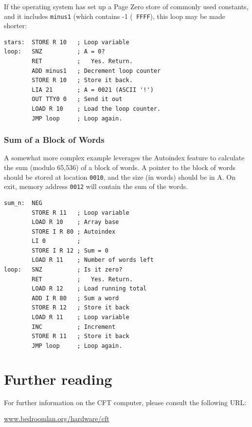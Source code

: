 \documentclass[11pt,a4paper,twocolumns]{article}
\newcommand\link[1]{\sf\href{http://#1}{#1}}
\newcommand\register[1]{\textsf{#1}}
\newcommand\A{\register{A}}
\begin{document}
If the operating system has set up a Page Zero store of commonly used
constants, and it includes {\tt minus1} (which contains -1 ({\tt
  FFFF}), this loop may be made shorter:

\begin{verbatim}
stars:  STORE R 10   ; Loop variable
loop:   SNZ          ; A = 0?
        RET          ;   Yes. Return.
        ADD minus1   ; Decrement loop counter
        STORE R 10   ; Store it back.
        LIA 21       ; A = 0021 (ASCII '!')
        OUT TTY0 0   ; Send it out
        LOAD R 10    ; Load the loop counter.
        JMP loop     ; Loop again.
\end{verbatim}

\subsubsection{Sum of a Block of Words}

A somewhat more complex example leverages the Autoindex feature to
calculate the sum (modulo 65,536) of a block of words. A pointer to
the block of words should be stored at location {\tt 0010}, and the
size (in words) should be in \A. On exit, memory address {\tt 0012}
will contain the sum of the words.

\begin{verbatim}
sum_n:  NEG
        STORE R 11   ; Loop variable
        LOAD R 10    ; Array base
        STORE I R 80 ; Autoindex
        LI 0         ; 
        STORE I R 12 ; Sum = 0
        LOAD R 11    ; Number of words left
loop:   SNZ          ; Is it zero?
        RET          ;   Yes. Return.
        LOAD R 12    ; Load running total
        ADD I R 80   ; Sum a word
        STORE R 12   ; Store it back
        LOAD R 11    ; Loop variable
        INC          ; Increment
        STORE R 11   ; Store it back
        JMP loop     ; Loop again.
\end{verbatim}

\section{Further reading}

For further information on the CFT computer, please consult the
following URL:

\begin{center}
\link{www.bedroomlan.org/hardware/cft}
\end{center}
\end{document}

